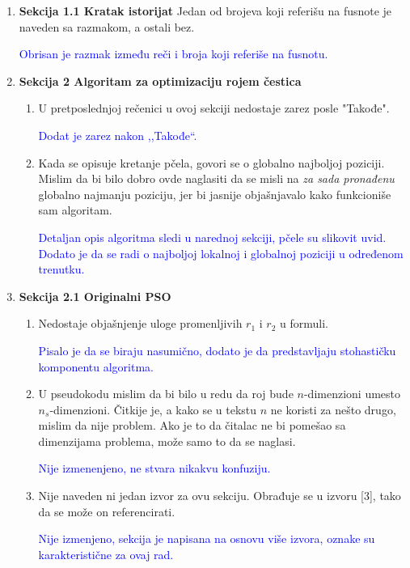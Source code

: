 \documentclass[a4paper]{report}
\newcommand{\odgovor}[1]{\textcolor{blue}{#1}}
\begin{document}
\begin{enumerate}
    \item \textbf{Sekcija 1.1 Kratak istorijat} Jedan od brojeva koji referišu na fusnote je naveden sa razmakom, a ostali bez.
    
    \odgovor{Obrisan je razmak između reči i broja koji referiše na fusnotu.}
    
    \item \textbf{Sekcija 2 Algoritam za optimizaciju rojem čestica} \begin{enumerate}
        \item U pretposlednjoj rečenici u ovoj sekciji nedostaje zarez posle "Takođe".
        
        \odgovor{Dodat je zarez nakon ,,Takođe``.}
        
        \item Kada se opisuje kretanje pčela, govori se o globalno najboljoj poziciji. Mislim da bi bilo dobro ovde naglasiti da se misli na \textit{za sada pronađenu} globalno najmanju poziciju, jer bi jasnije objašnjavalo kako funkcioniše sam algoritam.
        
        \odgovor{Detaljan opis algoritma sledi u narednoj sekciji, pčele su slikovit uvid. Dodato je da se radi o najboljoj lokalnoj i globalnoj poziciji u određenom trenutku.}
    \end{enumerate}
    
    \item \textbf{Sekcija 2.1 Originalni PSO}
    \begin{enumerate}
        \item Nedostaje objašnjenje uloge promenljivih $r_1$ i $r_2$ u formuli.
        
        \odgovor{Pisalo je da se biraju nasumično, dodato je da predstavljaju stohastičku komponentu algoritma.}
        \item U pseudokodu mislim da bi bilo u redu da roj bude $n$-dimenzioni umesto $n_s$-dimenzioni. Čitkije je, a kako se u tekstu $n$ ne koristi za nešto drugo, mislim da nije problem. Ako je to da čitalac ne bi pomešao sa dimenzijama problema, može samo to da se naglasi.
        
        
        \odgovor{Nije izmenenjeno, ne stvara nikakvu konfuziju.}
        \item Nije naveden ni jedan izvor za ovu sekciju. Obrađuje se u izvoru [3], tako da se može on referencirati.
        
        \odgovor{Nije izmenjeno, sekcija je napisana na osnovu više izvora, oznake su karakteristične za ovaj rad.}
        

\end{enumerate}
\end{enumerate}
\end{document}
